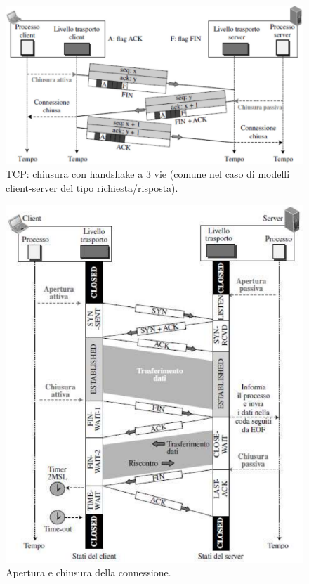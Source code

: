 \documentclass[11pt, italian, openany]{book}
\begin{document}
\begin{sloppypar}
\pagebreak

\begin{figure}[!h]
	\centering
	\includegraphics[scale=0.35]{images/tcp-chiusura-3way-handshake.png}
	\caption{TCP: chiusura con handshake a 3 vie (comune nel caso di modelli client-server del tipo richiesta/risposta).}
	\label{fig:chiusura-3way}
\end{figure}

\begin{figure}[!h]
	\centering
	\includegraphics[scale=0.55]{images/tcp-apertura-chiusura.png}
	\caption{Apertura e chiusura della connessione.}
	\label{fig:tcp-apertura-chiusura}
\end{figure}


\end{sloppypar}
\end{document}
